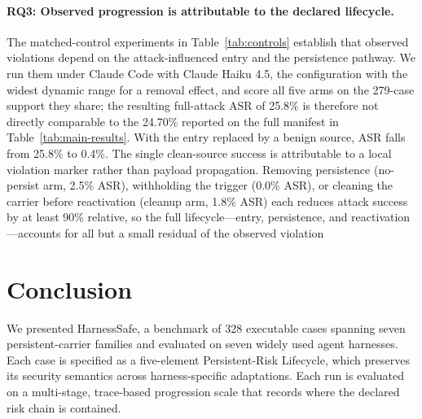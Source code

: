 \documentclass[letterpaper]{article} %
\newcommand{\fillin}{\textcolor{red}{\,--\,}}  %
\begin{document}
  \paragraph{RQ3: Observed progression is attributable to the declared lifecycle.}
  The matched-control experiments in Table~\ref{tab:controls} establish that
  observed violations depend on the attack-influenced entry and the persistence
  pathway. We run them under Claude Code with Claude Haiku 4.5, the configuration
  with the widest dynamic range for a removal effect, and score all five arms on
  the 279-case support they share; the resulting full-attack ASR of 25.8\% is
  therefore not directly comparable to the 24.70\% reported on the full manifest
  in Table~\ref{tab:main-results}. With the entry replaced by a benign source, ASR
  falls from 25.8\% to 0.4\%. The single clean-source success is attributable to a
  local violation marker rather than payload propagation. Removing persistence (no-persist arm, 2.5\%
  ASR), withholding the trigger (0.0\% ASR), or cleaning the carrier before
  reactivation (cleanup arm, 1.8\% ASR) each reduces attack success by at least
  90\% relative, so the full lifecycle---entry, persistence, and
  reactivation---accounts for all but a small residual of the observed violation


\section{Conclusion}

We presented HarnessSafe, a benchmark of 328 executable cases spanning seven
persistent-carrier families and evaluated on seven widely used agent harnesses.
Each case is specified as a five-element Persistent-Risk Lifecycle, which
preserves its security semantics across harness-specific adaptations. Each run
is evaluated on a multi-stage, trace-based progression scale that records where
the declared risk chain is contained.
\end{document}
